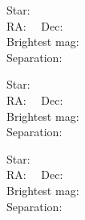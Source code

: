 \documentclass[12pt]{article}
\begin{document}
\bigskip\noindent 


\parbox[b]{8cm}{ Star: \makebox[3cm]{\hrulefill}\\
RA: \makebox[1.5cm]{\hrulefill} \ \ Dec: \makebox[1.5 cm]{\hrulefill} \\
Brightest mag: \makebox[1cm]{\hrulefill} \\
Separation:  \makebox[1cm]{\hrulefill} \\ }   \begin{minipage}[b]{8cm}{}\end{minipage}

\bigskip\noindent 



\parbox[b]{8cm}{ Star: \makebox[3cm]{\hrulefill}\\
RA: \makebox[1.5cm]{\hrulefill} \ \ Dec: \makebox[1.5 cm]{\hrulefill} \\
Brightest mag: \makebox[1cm]{\hrulefill} \\
Separation:  \makebox[1cm]{\hrulefill} \\ }   \begin{minipage}[b]{8cm}{}\end{minipage}

\bigskip\noindent 


\parbox[b]{8cm}{ Star: \makebox[3cm]{\hrulefill}\\
RA: \makebox[1.5cm]{\hrulefill} \ \ Dec: \makebox[1.5 cm]{\hrulefill} \\
Brightest mag: \makebox[1cm]{\hrulefill} \\
Separation:  \makebox[1cm]{\hrulefill} \\ }   \begin{minipage}[b]{8cm}{}\end{minipage}

\bigskip\noindent 
\end{document}
